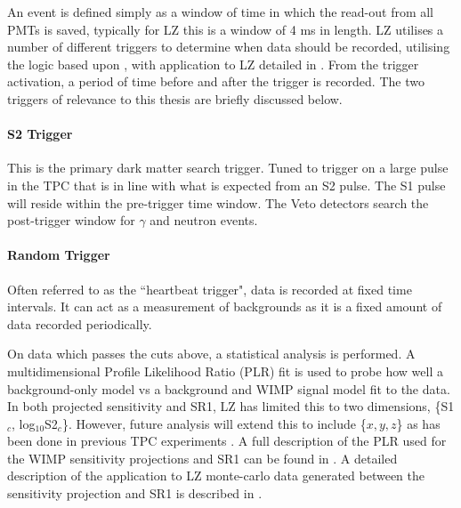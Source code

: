 \par
An event is defined simply as a window of time in which the read-out from all PMTs is saved, typically for LZ this is a window of 4 ms in length.
LZ utilises a number of different triggers to determine when data should be recorded, utilising the logic based upon \cite{lux_trigger_logic_ref}, with application to LZ detailed in \cite{nicolasangelides_thesis_ref}.
From the trigger activation, a period of time before and after the trigger is recorded.
The two triggers of relevance to this thesis are briefly discussed below.

\paragraph{S2 Trigger}
\par
This is the primary dark matter search trigger.
Tuned to trigger on a large pulse in the TPC that is in line with what is expected from an S2 pulse.
The S1 pulse will reside within the pre-trigger time window.
The Veto detectors search the post-trigger window for $\gamma$ and neutron events.

\paragraph{Random Trigger}
Often referred to as the ``heartbeat trigger", data is recorded at fixed time intervals.
It can act as a measurement of backgrounds as it is a fixed amount of data recorded periodically.

\par
On data which passes the cuts above, a statistical analysis is performed.
A multidimensional Profile Likelihood Ratio (PLR) fit is used to probe how well a background-only model vs a background and WIMP signal model fit to the data.
In both projected sensitivity and SR1, LZ has limited this to two dimensions, \{S1$_c$, log$_{10}$S2$_c$\}.
However, future analysis will extend this to include \{$x,y,z$\} as has been done in previous TPC experiments \cite{LUX_RUN1_EFT_2021,LUX_RUN4_EFT_2021,shaunalsum_thesis_ref}.
A full description of the PLR used for the WIMP sensitivity projections and SR1 can be found in \cite{LZ_Ibles_LZStats_Thesis_ref}. 
A detailed description of the application to LZ monte-carlo data generated between the sensitivity projection and SR1 is described in \cite{jonathannikoleyczik_thesis_ref}.

